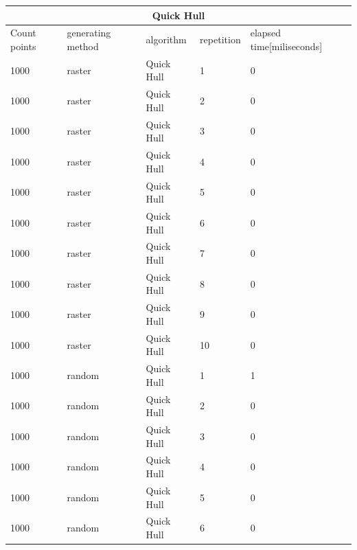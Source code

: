 \documentclass[12pt]{article}
\begin{document}
\begin{longtable}{|l|l|l|l|l|}
\hline
\multicolumn{5}{|c|}{\textbf{Quick Hull}}                                                  \\ \hline
Count points & generating method & algorithm  & repetition & elapsed time{[}miliseconds{]} \\ \hline
1000         & raster            & Quick Hull & 1          & 0                             \\ \hline
1000         & raster            & Quick Hull & 2          & 0                             \\ \hline
1000         & raster            & Quick Hull & 3          & 0                             \\ \hline
1000         & raster            & Quick Hull & 4          & 0                             \\ \hline
1000         & raster            & Quick Hull & 5          & 0                             \\ \hline
1000         & raster            & Quick Hull & 6          & 0                             \\ \hline
1000         & raster            & Quick Hull & 7          & 0                             \\ \hline
1000         & raster            & Quick Hull & 8          & 0                             \\ \hline
1000         & raster            & Quick Hull & 9          & 0                             \\ \hline
1000         & raster            & Quick Hull & 10         & 0                             \\ \hline
1000         & random            & Quick Hull & 1          & 1                             \\ \hline
1000         & random            & Quick Hull & 2          & 0                             \\ \hline
1000         & random            & Quick Hull & 3          & 0                             \\ \hline
1000         & random            & Quick Hull & 4          & 0                             \\ \hline
1000         & random            & Quick Hull & 5          & 0                             \\ \hline
1000         & random            & Quick Hull & 6          & 0                             \\ \hline

\end{longtable}
\end{document}
